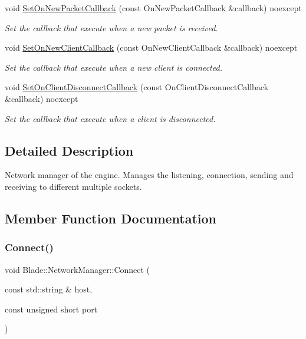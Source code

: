 \begin{DoxyCompactItemize}
void \hyperlink{class_blade_1_1_network_manager_a12f5afdfc075b71ea82d4d657a78d780}{Set\+On\+New\+Packet\+Callback} (const On\+New\+Packet\+Callback \&callback) noexcept
\begin{DoxyCompactList}\small\item\em Set the callback that execute when a new packet is received. \end{DoxyCompactList}\item 
void \hyperlink{class_blade_1_1_network_manager_a192f822f26e76829c2414f1505418a78}{Set\+On\+New\+Client\+Callback} (const On\+New\+Client\+Callback \&callback) noexcept
\begin{DoxyCompactList}\small\item\em Set the callback that execute when a new client is connected. \end{DoxyCompactList}\item 
void \hyperlink{class_blade_1_1_network_manager_ada4cd3f291d3775e7467c5be31090a99}{Set\+On\+Client\+Disconnect\+Callback} (const On\+Client\+Disconnect\+Callback \&callback) noexcept
\begin{DoxyCompactList}\small\item\em Set the callback that execute when a client is disconnected. \end{DoxyCompactList}\end{DoxyCompactItemize}


\subsection{Detailed Description}
Network manager of the engine. Manages the listening, connection, sending and receiving to different multiple sockets. 

\subsection{Member Function Documentation}
\mbox{\label{class_blade_1_1_network_manager_a61a872d6eec9050280dc041a7cda3759}} 
\subsubsection{\texorpdfstring{Connect()}{Connect()}}
{\footnotesize\ttfamily void Blade\+::\+Network\+Manager\+::\+Connect (\begin{DoxyParamCaption}\item[{const std\+::string \&}]{host,  }\item[{const unsigned short}]{port }\end{DoxyParamCaption})\hspace{0.3cm}{\ttfamily [noexcept]}}



